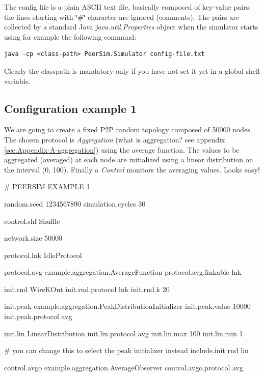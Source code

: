 \documentclass[a4paper,11pt]{article}
\begin{document}
The config file is a plain ASCII text file, basically composed of
key-value pairs; the lines starting with \char`\"{}\#\char`\"{} character
are ignored (comments). The pairs are collected by a standard Java
\emph{java.util.Properties} object when the simulator starts using
for example the following command:

\begin{verbatim}
java -cp <class-path> PeerSim.Simulator config-file.txt \end{verbatim}


Clearly the classpath is mandatory only if you have not set it yet
in a global shell variable.

\subsection{Configuration example 1}

We are going to create a fixed P2P random topology composed of 50000
nodes.
The chosen protocol is \emph{Aggregation} (what is
aggregation? see appendix \ref{sec:Appendix-A-aggregation}) using
the average function. The values to be aggregated (averaged) at each
node are initialized using a linear distribution on the interval (0,
100). Finally a \emph{Control} monitors the averaging values.
Looks easy!

\footnotesize
\begin{listing}{1}
# PEERSIM EXAMPLE 1

random.seed 1234567890
simulation.cycles 30

control.shf Shuffle

network.size 50000
 
protocol.lnk IdleProtocol

protocol.avg example.aggregation.AverageFunction
protocol.avg.linkable lnk
 
init.rnd WireKOut
init.rnd.protocol lnk
init.rnd.k 20

init.peak example.aggregation.PeakDistributionInitializer
init.peak.value 10000
init.peak.protocol avg

init.lin LinearDistribution
init.lin.protocol avg
init.lin.max 100
init.lin.min 1

# you can change this to select the peak initializer instead
include.init rnd lin

control.avgo example.aggregation.AverageObserver
control.avgo.protocol avg
\end{listing}

\normalsize
\end{document}
